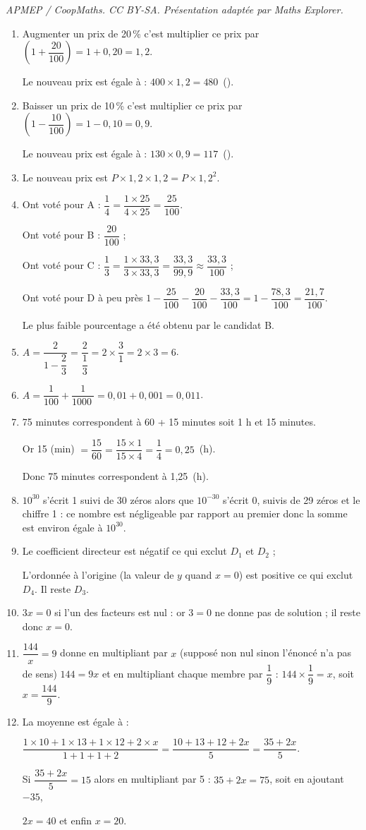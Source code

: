 \documentclass[10pt]{article}
\providecommand{\euro}{\texteuro}
\providecommand{\np}[2][]{{#2~#1}}
\providecommand{\euro}{{\text{€}}}
\renewcommand{\euro}{\ifmmode\text{\texteuro}\else\texteuro\fi}
\begin{document}
\noindent\textit{APMEP / CoopMaths. CC BY-SA. Présentation adaptée par Maths Explorer.}\par\medskip
\begin{enumerate}
\item Augmenter un prix de 20\,\% c'est multiplier ce prix par $\left(1 + \dfrac{20}{100}\right) = 1 + 0,20 = 1,2$.

Le nouveau prix est égale à : $400 \times 1,2 = 480$~(\euro).
\item Baisser un prix de 10\,\% c'est multiplier ce prix par $\left(1 - \dfrac{10}{100}\right) = 1 - 0,10 = 0,9$.

Le nouveau prix est égale à : $130 \times 0,9 = 117$~(\euro).
\item Le nouveau prix est $P \times 1,2 \times 1,2 = P \times 1,2^2$.
\item Ont voté pour A : $\dfrac 14 = \dfrac{1 \times 25}{4 \times 25} = \dfrac{25}{100}$.

Ont voté pour B : $\dfrac{20}{100}$ ;

Ont voté pour C : $\dfrac{1}{3} = \dfrac{1 \times 33,3}{3 \times 33,3} = \dfrac{33,3}{99,9} \approx \dfrac{33,3}{100}$ ;

Ont voté pour D à peu près $1 - \dfrac{25}{100} - \dfrac{20}{100} - \dfrac{33,3}{100} = 1 - \dfrac{78,3}{100} = \dfrac{21,7}{100}$.

Le plus faible pourcentage a été obtenu par le candidat B.
\item $A = \dfrac{2}{1 - \dfrac 23} = \dfrac{2}{\dfrac 13} = 2 \times \dfrac 31 = 2 \times 3 = 6$.
\item $A = \dfrac{1}{100} +  \dfrac{1}{\np{1000}} = 0,01 + 0,001 = 0,011$.
\item 75 minutes correspondent à 60 + 15 minutes soit 1 h et 15 minutes.

Or 15 (min) $= \dfrac{15}{60} = \dfrac{15 \times 1}{15 \times 4} = \dfrac 14 = 0,25$~(h).

Donc 75 minutes correspondent à 1,25~(h).
\item $10^{30}$ s'écrit 1 suivi de 30 zéros alors que  $10^{-30}$ s'écrit 0, suivis de 29 zéros et le chiffre 1 : ce nombre est négligeable par rapport au premier donc la somme est environ égale à  $10^{30}$.
\item Le coefficient directeur est négatif ce qui exclut $D_1$ et $D_2$ ;

L'ordonnée à l'origine (la valeur de $y$ quand $x = 0$) est positive ce qui exclut $D_4$. Il reste $D_3$.
\item $3x = 0$ si l'un des facteurs est nul : or $3 = 0$ ne donne pas de solution ; il reste donc $x = 0$.
\item $\dfrac{144}{x} = 9$ donne en multipliant par $x$ (supposé non nul sinon l'énoncé n'a pas de sens) $144 = 9x$ et en multipliant chaque membre par $\dfrac 19$ : $144 \times \dfrac 19 = x$, soit $x = \dfrac{144}{9}$.
\item La moyenne est égale à :

$\dfrac{1 \times 10 + 1 \times 13 + 1  \times 12 + 2 \times x}{1 + 1 + 1 + 2} = \dfrac{10 + 13 + 12 + 2x}{5} = \dfrac{35 + 2x}{5}$.

Si $\dfrac{35 + 2x}{5} = 15$ alors en multipliant par 5 : $35 + 2x = 75$, soit en ajoutant $- 35$,

 $2x = 40$ et enfin $x = 20$.
\end{enumerate}
\end{document}
